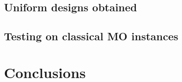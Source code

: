 \documentclass[a4paper,10pt]{llncs}
\begin{document}
\subsection{Uniform designs obtained}


\subsection{Testing on classical MO instances}


\section{Conclusions}




\end{document}
